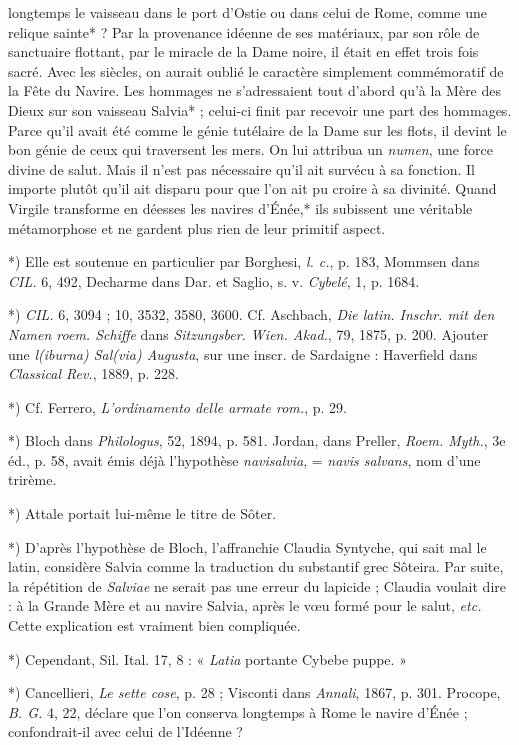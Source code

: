 \documentclass[a4paper, 11pt, oneside, polutonikogreek, french]{article}
\begin{document}
longtemps le vaisseau dans le port d'Ostie ou dans celui de Rome, comme une relique sainte* ? Par la provenance idéenne de ses matériaux, par son rôle de sanctuaire flottant, par le miracle de la Dame noire, il était en effet trois fois sacré. Avec les siècles, on aurait oublié le caractère simplement commémoratif de la Fête du Navire. Les hommages ne s'adressaient tout d'abord qu'à la Mère des Dieux sur son vaisseau Salvia* ; celui-ci finit par recevoir une part des hommages. Parce qu'il avait été comme le génie tutélaire de la Dame sur les flots, il devint le bon génie de ceux qui traversent les mers. On lui attribua un \emph{numen}, une force divine de salut. Mais il n'est pas nécessaire qu'il ait survécu à sa fonction. Il importe plutôt qu'il ait disparu pour que l'on ait pu croire à sa divinité. Quand Virgile transforme en déesses les navires d'Énée,* ils subissent une véritable métamorphose et ne gardent plus rien de leur primitif aspect.

*) Elle est soutenue en particulier par Borghesi, \emph{l. c.}, p. 183, Mommsen dans \emph{CIL.} 6, 492, Decharme dans Dar. et Saglio, s. v. \emph{Cybelé}, 1, p. 1684.

*) \emph{CIL.} 6, 3094 ; 10, 3532, 3580, 3600. Cf. Aschbach, \emph{Die latin. Inschr. mit den Namen roem. Schiffe} dans \emph{Sitzungsber. Wien. Akad.}, 79, 1875, p. 200. Ajouter une \emph{l(iburna) Sal(via) Augusta}, sur une inscr. de Sardaigne : Haverfield dans \emph{Classical Rev.}, 1889, p. 228.

*) Cf. Ferrero, \emph{L'ordinamento delle armate rom.}, p. 29.

*) Bloch dans \emph{Philologus}, 52, 1894, p. 581. Jordan, dans Preller, \emph{Roem. Myth.}, 3e éd., p. 58, avait émis déjà l'hypothèse \emph{navisalvia}, = \emph{navis salvans}, nom d'une trirème.

*) Attale portait lui-même le titre de Sôter.

*) D'après l'hypothèse de Bloch, l'affranchie Claudia Syntyche, qui sait mal le latin, considère Salvia comme la traduction du substantif grec Sôteira. Par suite, la répétition de \emph{Salviae} ne serait pas une erreur du lapicide ; Claudia voulait dire : à la Grande Mère et au navire Salvia, après le vœu formé pour le salut, \emph{etc.} Cette explication est vraiment bien compliquée.

*) Cependant, Sil. Ital. 17, 8 : « \emph{Latia} portante Cybebe puppe. »

*) Cancellieri, \emph{Le sette cose}, p. 28 ; Visconti dans \emph{Annali}, 1867, p. 301. Procope, \emph{B. G.} 4, 22, déclare que l'on conserva longtemps à Rome le navire d'Énée ; confondrait-il avec celui de l'Idéenne ?
\end{document}
